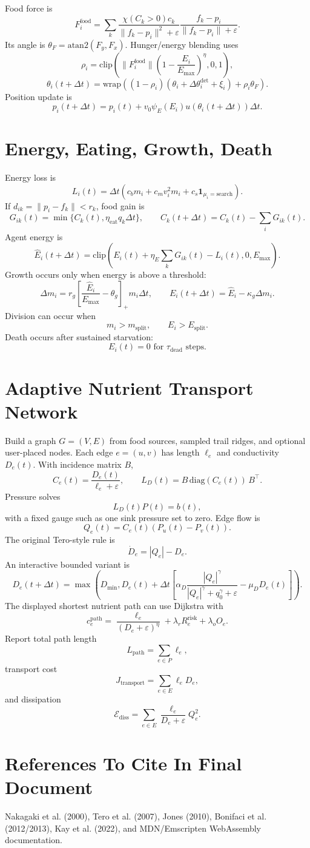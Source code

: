 \documentclass[11pt]{article}
\begin{document}
Food force is
\[
F_i^{\mathrm{food}}=\sum_k
\frac{\chi(C_k>0)c_k}{\|f_k-p_i\|^2+\varepsilon}
\frac{f_k-p_i}{\|f_k-p_i\|+\varepsilon}.
\]
Its angle is $\theta_F=\mathrm{atan2}(F_y,F_x)$. Hunger/energy blending uses
\[
\rho_i=\mathrm{clip}\left(\|F_i^{\mathrm{food}}\|
\left(1-\frac{E_i}{E_{\max}}\right)^\eta,0,1\right),
\]
\[
\theta_i(t+\Delta t)=
\mathrm{wrap}\left((1-\rho_i)(\theta_i+\Delta\theta_i^{\mathrm{det}}+\xi_i)
+\rho_i\theta_F\right).
\]
Position update is
\[
p_i(t+\Delta t)=p_i(t)+v_0\psi_E(E_i)u(\theta_i(t+\Delta t))\Delta t.
\]

\section{Energy, Eating, Growth, Death}
Energy loss is
\[
L_i(t)=\Delta t\left(c_bm_i+c_mv_i^2m_i+c_s\mathbf 1_{\mu_i=\mathrm{search}}\right).
\]
If $d_{ik}=\|p_i-f_k\|<r_k$, food gain is
\[
G_{ik}(t)=\min\{C_k(t),\eta_{\mathrm{eat}}q_k\Delta t\},
\qquad
C_k(t+\Delta t)=C_k(t)-\sum_i G_{ik}(t).
\]
Agent energy is
\[
\hat E_i(t+\Delta t)=\mathrm{clip}\left(E_i(t)+\eta_E\sum_k G_{ik}(t)-L_i(t),0,E_{\max}\right).
\]
Growth occurs only when energy is above a threshold:
\[
\Delta m_i=r_g\left[\frac{\hat E_i}{E_{\max}}-\theta_g\right]_+m_i\Delta t,
\qquad
E_i(t+\Delta t)=\hat E_i-\kappa_g\Delta m_i.
\]
Division can occur when
\[
m_i>m_{\mathrm{split}},\qquad E_i>E_{\mathrm{split}}.
\]
Death occurs after sustained starvation:
\[
E_i(t)=0 \text{ for } \tau_{\mathrm{dead}} \text{ steps}.
\]

\section{Adaptive Nutrient Transport Network}
Build a graph $G=(V,E)$ from food sources, sampled trail ridges, and optional
user-placed nodes. Each edge $e=(u,v)$ has length $\ell_e$ and conductivity
$D_e(t)$. With incidence matrix $B$,
\[
C_e(t)=\frac{D_e(t)}{\ell_e+\varepsilon},\qquad
L_D(t)=B\,\mathrm{diag}(C_e(t))\,B^\top.
\]
Pressure solves
\[
L_D(t)P(t)=b(t),
\]
with a fixed gauge such as one sink pressure set to zero. Edge flow is
\[
Q_e(t)=C_e(t)(P_u(t)-P_v(t)).
\]
The original Tero-style rule is
\[
\dot D_e=|Q_e|-D_e.
\]
An interactive bounded variant is
\[
D_e(t+\Delta t)=\max\left(D_{\min},
D_e(t)+\Delta t\left[
\alpha_D\frac{|Q_e|^\gamma}{|Q_e|^\gamma+q_0^\gamma+\varepsilon}
-\mu_DD_e(t)
\right]\right).
\]
The displayed shortest nutrient path can use Dijkstra with
\[
c_e^{\mathrm{path}}=\frac{\ell_e}{(D_e+\varepsilon)^\eta}
+\lambda_r R_e^{\mathrm{risk}}+\lambda_o O_e.
\]
Report total path length
\[
L_{\mathrm{path}}=\sum_{e\in P}\ell_e,
\]
transport cost
\[
J_{\mathrm{transport}}=\sum_{e\in E}\ell_eD_e,
\]
and dissipation
\[
\mathcal E_{\mathrm{diss}}=\sum_{e\in E}\frac{\ell_e}{D_e+\varepsilon}Q_e^2.
\]

\section{References To Cite In Final Document}
Nakagaki et al. (2000), Tero et al. (2007), Jones (2010), Bonifaci et al.
(2012/2013), Kay et al. (2022), and MDN/Emscripten WebAssembly documentation.
\end{document}
